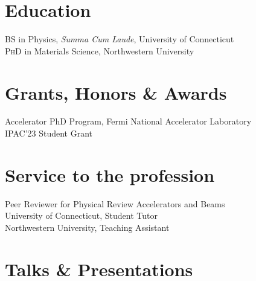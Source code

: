 \documentclass[11pt]{article} %
\begin{document}
\section*{Education}

\textsc{BS} in Physics, \emph{Summa Cum Laude}, University of Connecticut\\
\textsc{PhD} in Materials Science, Northwestern University


\section*{Grants, Honors \& Awards}

Accelerator PhD Program, Fermi National Accelerator Laboratory\\
IPAC'23 Student Grant





\section*{Service to the profession}

Peer Reviewer for Physical Review Accelerators and Beams\\
 University of Connecticut, Student Tutor\\
 Northwestern University, Teaching Assistant

\vfill %




\section*{Talks \& Presentations}
\end{document}
